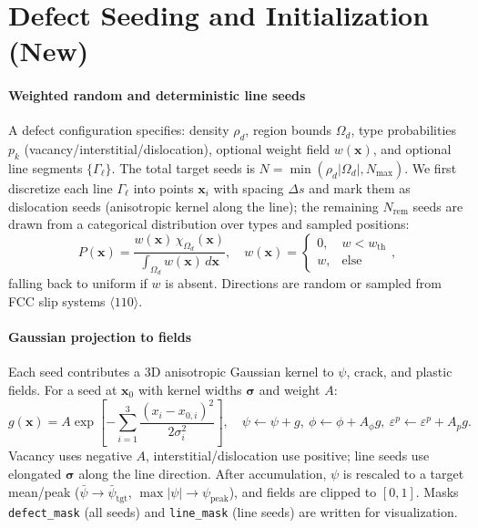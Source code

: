 \documentclass[11pt]{article}
\begin{document}
\section{Defect Seeding and Initialization (New)}
\paragraph{Weighted random and deterministic line seeds} A defect configuration specifies: density $\rho_d$, region bounds $\Omega_d$, type probabilities $p_k$ (vacancy/interstitial/dislocation), optional weight field $w(\mathbf{x})$, and optional line segments $\{\Gamma_\ell\}$. The total target seeds is $N=\min(\rho_d |\Omega_d|, N_{\max})$. We first discretize each line $\Gamma_\ell$ into points $\mathbf{x}_i$ with spacing $\Delta s$ and mark them as dislocation seeds (anisotropic kernel along the line); the remaining $N_{\text{rem}}$ seeds are drawn from a categorical distribution over types and sampled positions:
\begin{equation}
P(\mathbf{x}) = \frac{w(\mathbf{x})\,\chi_{\Omega_d}(\mathbf{x})}{\int_{\Omega_d} w(\mathbf{x})\,d\mathbf{x}}, \quad w(\mathbf{x}) = \begin{cases}0,&w< w_{\text{th}}\\ w,&\text{else}\end{cases},
\end{equation}
falling back to uniform if $w$ is absent. Directions are random or sampled from FCC slip systems $\langle 110\rangle$.

\paragraph{Gaussian projection to fields} Each seed contributes a 3D anisotropic Gaussian kernel to $\psi$, crack, and plastic fields. For a seed at $\mathbf{x}_0$ with kernel widths $\boldsymbol{\sigma}$ and weight $A$:
\begin{equation}
g(\mathbf{x}) = A \exp\!\left[-\sum_{i=1}^3 \frac{(x_i-x_{0,i})^2}{2\sigma_i^2}\right], \quad
\psi \leftarrow \psi + g,\ \phi \leftarrow \phi + A_\phi g,\ \varepsilon^p \leftarrow \varepsilon^p + A_p g.
\end{equation}
Vacancy uses negative $A$, interstitial/dislocation use positive; line seeds use elongated $\boldsymbol{\sigma}$ along the line direction. After accumulation, $\psi$ is rescaled to a target mean/peak ($\bar{\psi}\rightarrow \bar{\psi}_{\text{tgt}}$, $\max|\psi|\rightarrow \psi_{\text{peak}}$), and fields are clipped to $[0,1]$. Masks \texttt{defect\_mask} (all seeds) and \texttt{line\_mask} (line seeds) are written for visualization.
\end{document}
